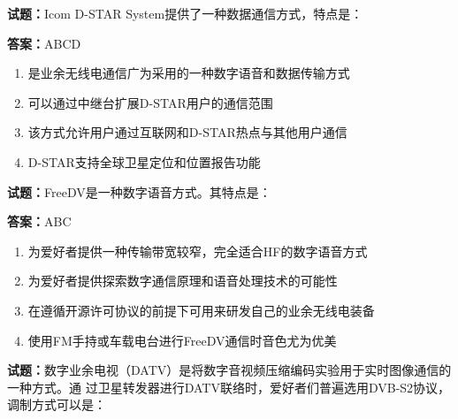 \documentclass{ctexbook}
\begin{document}




\vspace{1em}

\textbf{试题：}Icom D-STAR System提供了一种数据通信方式，特点是： 

\textbf{答案：}ABCD 

\begin{enumerate}[leftmargin=3em]
  \item 是业余无线电通信广为采用的一种数字语音和数据传输方式 

  \item 可以通过中继台扩展D-STAR用户的通信范围 

  \item 该方式允许用户通过互联网和D-STAR热点与其他用户通信 

  \item D-STAR支持全球卫星定位和位置报告功能 

\end{enumerate}






\vspace{1em}

\textbf{试题：}FreeDV是一种数字语音方式。其特点是： 

\textbf{答案：}ABC 

\begin{enumerate}[leftmargin=3em]
  \item 为爱好者提供一种传输带宽较窄，完全适合HF的数字语音方式 

  \item 为爱好者提供探索数字通信原理和语音处理技术的可能性 

  \item 在遵循开源许可协议的前提下可用来研发自己的业余无线电装备 

  \item 使用FM手持或车载电台进行FreeDV通信时音色尤为优美 

\end{enumerate}





\vspace{1em}

\textbf{试题：}数字业余电视（DATV）是将数字音视频压缩编码实验用于实时图像通信的一种方式。通
过卫星转发器进行DATV联络时，爱好者们普遍选用DVB-S2协议，调制方式可以是： 
\end{document}
